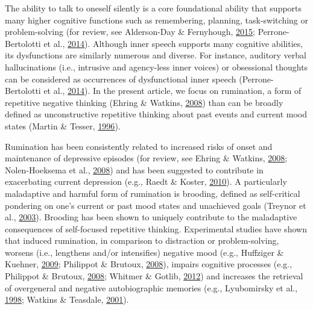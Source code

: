 \documentclass[a4paper,12pt,twoside,openright,oldfontcommands]{memoir}
\begin{document}
The ability to talk to oneself silently is a core foundational ability that supports many higher cognitive functions such as remembering, planning, task-switching or problem-solving (for review, see Alderson-Day \& Fernyhough, \protect\hyperlink{ref-alderson-day_inner_2015}{2015}; Perrone-Bertolotti et al., \protect\hyperlink{ref-Perrone-Bertolotti2014}{2014}). Although inner speech supports many cognitive abilities, its dysfunctions are similarly numerous and diverse. For instance, auditory verbal hallucinations (i.e., intrusive and agency-less inner voices) or obsessional thoughts can be considered as occurrences of dysfunctional inner speech (Perrone-Bertolotti et al., \protect\hyperlink{ref-Perrone-Bertolotti2014}{2014}). In the present article, we focus on rumination, a form of repetitive negative thinking (Ehring \& Watkins, \protect\hyperlink{ref-ehring_repetitive_2008}{2008}) than can be broadly defined as unconstructive repetitive thinking about past events and current mood states (Martin \& Tesser, \protect\hyperlink{ref-Martin}{1996}).

Rumination has been consistently related to increased risks of onset and maintenance of depressive episodes (for review, see Ehring \& Watkins, \protect\hyperlink{ref-ehring_repetitive_2008}{2008}; Nolen-Hoeksema et al., \protect\hyperlink{ref-Nolen-Hoeksema2008}{2008}) and has been suggested to contribute in exacerbating current depression (e.g., Raedt \& Koster, \protect\hyperlink{ref-Raedt2010}{2010}). A particularly maladaptive and harmful form of rumination is brooding, defined as self-critical pondering on one's current or past mood states and unachieved goals (Treynor et al., \protect\hyperlink{ref-treynor_rumination_2003}{2003}). Brooding has been shown to uniquely contribute to the maladaptive consequences of self-focused repetitive thinking. Experimental studies have shown that induced rumination, in comparison to distraction or problem-solving, worsens (i.e., lengthens and/or intensifies) negative mood (e.g., Huffziger \& Kuehner, \protect\hyperlink{ref-Huffziger2009}{2009}; Philippot \& Brutoux, \protect\hyperlink{ref-Philippot2008}{2008}), impairs cognitive processes (e.g., Philippot \& Brutoux, \protect\hyperlink{ref-Philippot2008}{2008}; Whitmer \& Gotlib, \protect\hyperlink{ref-whitmer_switching_2012}{2012}) and increases the retrieval of overgeneral and negative autobiographic memories (e.g., Lyubomirsky et al., \protect\hyperlink{ref-Lyubomirsky1998}{1998}; Watkins \& Teasdale, \protect\hyperlink{ref-watkins_rumination_2001}{2001}).
\end{document}
